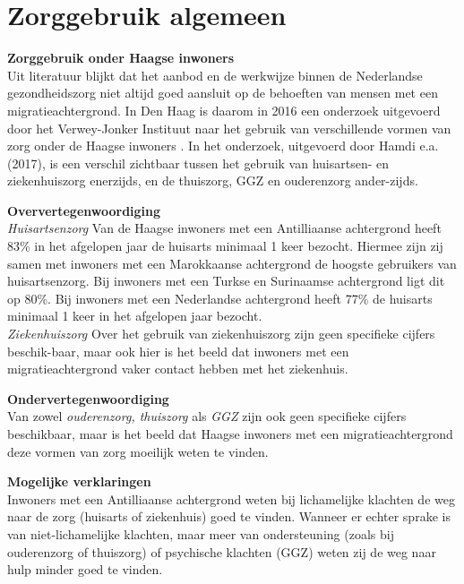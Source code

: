 \documentclass[]{book}
\begin{document}
\hypertarget{zorggebruik-algemeen}{%
\chapter*{Zorggebruik algemeen}\label{zorggebruik-algemeen}}

\textbf{Zorggebruik onder Haagse inwoners}\\
Uit literatuur blijkt dat het aanbod en de werkwijze binnen de
Nederlandse gezondheidszorg niet altijd goed aansluit op de behoeften
van mensen met een migratieachtergrond. In Den Haag is daarom in 2016
een onderzoek uitgevoerd door het Verwey-Jonker Instituut naar het
gebruik van verschillende vormen van zorg onder de Haagse inwoners
\citep{Hamdi2017}. In het onderzoek, uitgevoerd door Hamdi e.a. (2017),
is een verschil zichtbaar tussen het gebruik van huisartsen- en
ziekenhuiszorg enerzijds, en de thuiszorg, GGZ en ouderenzorg
ander-zijds.

\textbf{Oververtegenwoordiging}\\
\emph{Huisartsenzorg} Van de Haagse inwoners met een Antilliaanse
achtergrond heeft 83\% in het afgelopen jaar de huisarts minimaal 1 keer
bezocht. Hiermee zijn zij samen met inwoners met een Marokkaanse
achtergrond de hoogste gebruikers van huisartsenzorg. Bij inwoners met
een Turkse en Surinaamse achtergrond ligt dit op 80\%. Bij inwoners met
een Nederlandse achtergrond heeft 77\% de huisarts minimaal 1 keer in
het afgelopen jaar bezocht.\\
\emph{Ziekenhuiszorg} Over het gebruik van ziekenhuiszorg zijn geen
specifieke cijfers beschik-baar, maar ook hier is het beeld dat inwoners
met een migratieachtergrond vaker contact hebben met het ziekenhuis.

\textbf{Ondervertegenwoordiging}\\
Van zowel \emph{ouderenzorg, thuiszorg} als \emph{GGZ} zijn ook geen
specifieke cijfers beschikbaar, maar is het beeld dat Haagse inwoners
met een migratieachtergrond deze vormen van zorg moeilijk weten te
vinden.

\textbf{Mogelijke verklaringen}\\
Inwoners met een Antilliaanse achtergrond weten bij lichamelijke
klachten de weg naar de zorg (huisarts of ziekenhuis) goed te vinden.
Wanneer er echter sprake is van niet-lichamelijke klachten, maar meer
van ondersteuning (zoals bij ouderenzorg of thuiszorg) of psychische
klachten (GGZ) weten zij de weg naar hulp minder goed te vinden.
\end{document}
